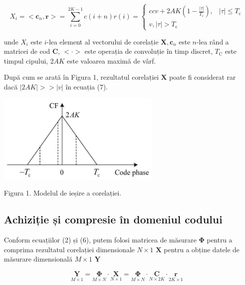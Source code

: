 \documentclass[10pt]{report}
\begin{document}
\begin{equation}
    X_{i}=<\mathbf{c}_{n}, \mathbf{r}>=\sum_{i=0}^{2 K-1} c(i+n) r(i)=\left \{\begin{matrix}{cc}
        v+2AK\left(1-\frac{|\tau|}{T_{\mathrm{c}}}\right), & |\tau| \leq T_{\mathrm{c}} \\
        v, |\tau|>T_{\mathrm{c}}
    \end{matrix}\right.
\end{equation}

unde \(X_{i}\) este \(i\)-lea element al vectorului de corelație \(\mathbf{X}, \mathbf{c}_{n}\) este \(n\)-lea rând a matricei de cod \(\mathbf{C}\), \(<\cdot>\) este operația de convoluție în timp discret, \(T_{\mathrm{C}}\) este timpul cipului, \(2 A K\) este valoarea maximă de vârf.

După cum se arată în Figura 1, rezultatul corelației \(\mathbf{X}\) poate fi considerat rar dacă \(|2 A K|>>|v|\) în ecuația (7).

\begin{center}
    \includegraphics[max width=8cm]{2023_06_04_7690788c3d6419e4c10eg-2}
\end{center}

Figura 1. Modelul de ieșire a corelației.

\subsection*{Achiziție și compresie în domeniul codului}
Conform ecuațiilor (2) și (6), putem folosi matricea de măsurare \(\boldsymbol{\Phi}\) pentru a comprima rezultatul corelației dimensionale \(N \times 1\) \(\mathbf{X}\) pentru a obține datele de măsurare dimensională \(M \times 1\) \(\mathbf{Y}\)


\begin{equation}
    \underset{M \times 1}{\mathbf{Y}}=\underset{M \times N}{\mathbf{\Phi}} \cdot \underset{N \times 1}{\mathbf{X}}= \underset{M \times N}{\mathbf{\Phi}} \cdot \underset{N \times 2 K}{\mathbf{C}} \cdot \underset{2 K \times 1}{\mathbf{r}}
\end{equation}
\end{document}
